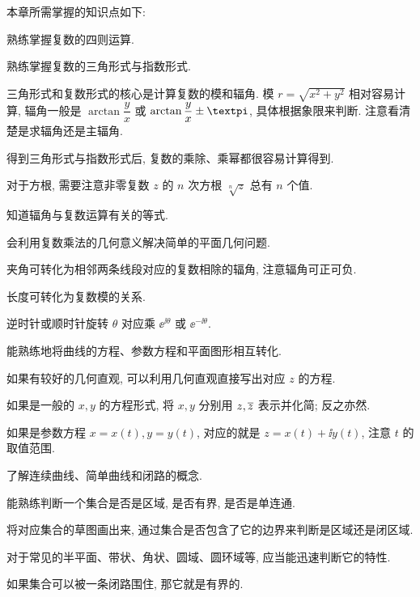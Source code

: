本章所需掌握的知识点如下:
\begin{conclusion}
  \item 熟练掌握复数的四则运算.
  \item 熟练掌握复数的三角形式与指数形式.
  \begin{conclusion}
    \item 三角形式和复数形式的核心是计算复数的模和辐角.
    模 $r=\sqrt{x^2+y^2}$ 相对容易计算, 辐角一般是 $\arctan \dfrac yx$ 或 $\arctan \dfrac yx\pm\cpi$, 具体根据象限来判断.
    注意看清楚是求辐角还是主辐角.
    \item 得到三角形式与指数形式后, 复数的乘除、乘幂都很容易计算得到.
    \item 对于方根, 需要注意非零复数 $z$ 的 $n$ 次方根 $\sqrt[n]{z}$ 总有 $n$ 个值.
    \item 知道辐角与复数运算有关的等式.
  \end{conclusion}
  \item 会利用复数乘法的几何意义解决简单的平面几何问题.
  \begin{conclusion}
    \item 夹角可转化为相邻两条线段对应的复数相除的辐角, 注意辐角可正可负.
    \item 长度可转化为复数模的关系.
    \item 逆时针或顺时针旋转 $
    \theta$ 对应乘 $\ee^{\ii\theta}$ 或 $\ee^{-\ii\theta}$.
  \end{conclusion}
  \item 能熟练地将曲线的方程、参数方程和平面图形相互转化.
  \begin{conclusion}
    \item 如果有较好的几何直观, 可以利用几何直观直接写出对应 $z$ 的方程.
    \item 如果是一般的 $x,y$ 的方程形式, 将 $x,y$ 分别用 $z,\overline z$ 表示并化简; 反之亦然.
    \item 如果是参数方程 $x=x(t),y=y(t)$, 对应的就是 $z=x(t)+\ii y(t)$, 注意 $t$ 的取值范围.
  \end{conclusion}
  \item 了解连续曲线、简单曲线和闭路的概念.
  \item 能熟练判断一个集合是否是区域, 是否有界, 是否是单连通.
  \begin{conclusion}
    \item 将对应集合的草图画出来, 通过集合是否包含了它的边界来判断是区域还是闭区域.
    \item 对于常见的半平面、带状、角状、圆域、圆环域等, 应当能迅速判断它的特性.
    \item 如果集合可以被一条闭路围住, 那它就是有界的.

\end{conclusion}
\end{conclusion}
